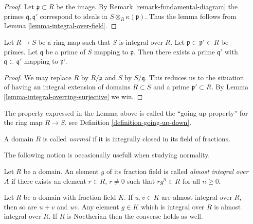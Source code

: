 \begin{proof}
Let $\mathfrak p \subset R$ be the image.
By Remark \ref{remark-fundamental-diagram}
the primes $\mathfrak q, \mathfrak q'$
correspond to ideals in
$S \otimes_R \kappa(\mathfrak p)$.
Thus the lemma follows from Lemma \ref{lemma-integral-over-field}.
\end{proof}

\begin{lemma}
\label{lemma-integral-going-up}
Let $R \to S$ be a ring map such that
$S$ is integral over $R$.
Let $\mathfrak p \subset \mathfrak p' \subset R$
be primes. Let $\mathfrak q$ be a prime of $S$ mapping
to $\mathfrak p$. Then there exists a prime $\mathfrak q'$
with $\mathfrak q \subset \mathfrak q'$
mapping to $\mathfrak p'$.
\end{lemma}

\begin{proof}
We may replace $R$ by $R/\mathfrak p$ and $S$ by $S/\mathfrak q$. 
This reduces us to the situation of having an integral
extension of domains $R \subset S$ and a prime $\mathfrak p' \subset R$.
By Lemma \ref{lemma-integral-overring-surjective} we win.
\end{proof}

\noindent
The property expressed in the Lemma above is called
the ``going up property'' for the ring map $R \to S$,
see Definition \ref{definition-going-up-down}.

\begin{definition}
\label{definition-ring-normal}
A domain $R$ is called {\it normal} if it is integrally
closed in its field of fractions.
\end{definition}

\noindent
The following notion is occasionally usefull when
studying normality.

\begin{definition}
\label{definition-almost-integral}
Let $R$ be a domain. An element $g$ of its fraction
field is called {\it almost integral over $A$}
if there exists an element $r \in R$, $r\not=0$
such that $rg^n \in R$ for all $n \geq 0$.
\end{definition}

\begin{lemma}
\label{lemma-almost-integral}
Let $R$ be a domain with fraction field $K$.
If $u,v \in K$ are almost integral over $R$, then so are
$u+v$ and $uv$. Any element $g \in K$ which is integral over $R$
is almost integral over $R$. If $R$ is Noetherian
then the converse holds as well.
\end{lemma}

